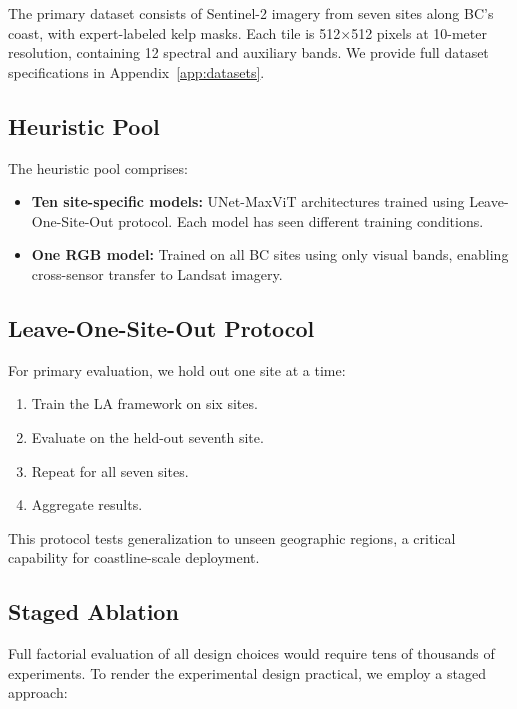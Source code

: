 \documentclass[11pt,a4paper]{article}
\begin{document}
The primary dataset consists of Sentinel-2 imagery from seven sites along BC's coast, with expert-labeled kelp masks. Each tile is 512$\times$512 pixels at 10-meter resolution, containing 12 spectral and auxiliary bands. We provide full dataset specifications in Appendix~\ref{app:datasets}.

\subsection{Heuristic Pool}

The heuristic pool comprises:
\begin{itemize}[noitemsep]
    \item \textbf{Ten site-specific models:} UNet-MaxViT architectures trained using Leave-One-Site-Out protocol. Each model has seen different training conditions.
    \item \textbf{One RGB model:} Trained on all BC sites using only visual bands, enabling cross-sensor transfer to Landsat imagery.
\end{itemize}

\subsection{Leave-One-Site-Out Protocol}

For primary evaluation, we hold out one site at a time:
\begin{enumerate}
    \item Train the LA framework on six sites.
    \item Evaluate on the held-out seventh site.
    \item Repeat for all seven sites.
    \item Aggregate results.
\end{enumerate}

This protocol tests generalization to unseen geographic regions, a critical capability for coastline-scale deployment.

\subsection{Staged Ablation}

Full factorial evaluation of all design choices would require tens of thousands of experiments. To render the experimental design practical, we employ a staged approach:
\end{document}
